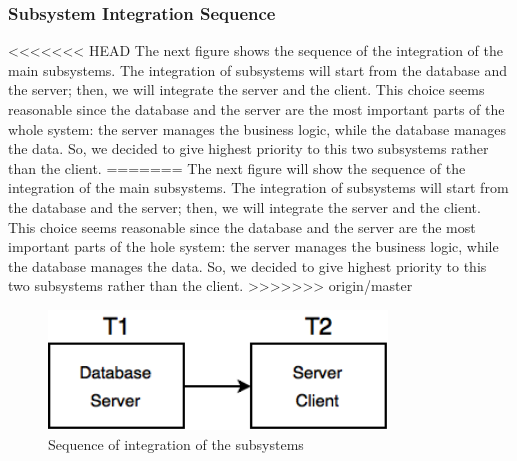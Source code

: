 \subsubsection{Subsystem Integration Sequence}
<<<<<<< HEAD
The next figure shows the sequence of the integration of the main subsystems.
\newline
The integration of subsystems will start from the database and the server; then, we will integrate the server and the client. This choice seems reasonable since the database and the server are the most important parts of the whole system: the server manages the business logic, while the database manages the data. So, we decided to give highest priority to this two subsystems rather than the client.
=======
The next figure will show the sequence of the integration of the main subsystems.
\newline
The integration of subsystems will start from the database and the server; then, we will integrate the server and the client. This choice seems reasonable since the database and the server are the most important parts of the hole system: the server manages the business logic, while the database manages the data. So, we decided to give highest priority to this two subsystems rather than the client.
>>>>>>> origin/master
\newline
\begin{figure}[H]
    \centering
    \includegraphics[width=9cm]{./Images/Subsystem.png}
    \caption{Sequence of integration of the subsystems}
    \label{fig: Sequence of integration of the subsystems}
\end{figure}